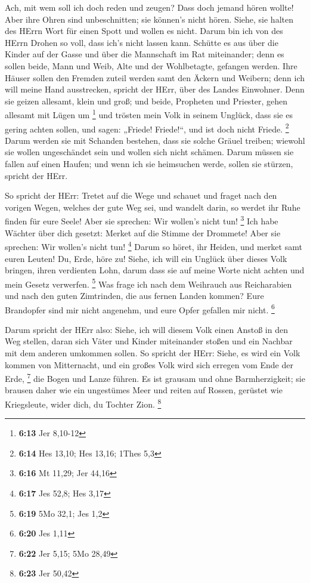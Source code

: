  Ach, mit wem soll ich doch reden und zeugen? Dass doch
jemand hören wollte! Aber ihre Ohren sind unbeschnitten; sie können's
nicht hören. Siehe, sie halten des HErrn Wort für einen Spott und wollen
es nicht.  Darum bin ich von des HErrn Drohen so voll, dass
ich's nicht lassen kann. Schütte es aus über die Kinder auf der Gasse
und über die Mannschaft im Rat miteinander; denn es sollen beide, Mann
und Weib, Alte und der Wohlbetagte, gefangen werden.  Ihre
Häuser sollen den Fremden zuteil werden samt den Äckern und Weibern;
denn ich will meine Hand ausstrecken, spricht der HErr, über des Landes
Einwohner.  Denn sie geizen allesamt, klein und groß; und
beide, Propheten und Priester, gehen allesamt mit Lügen um \footnote{\textbf{6:13}
  Jer 8,10-12}  und trösten mein Volk in seinem Unglück,
dass sie es gering achten sollen, und sagen: „Friede! Friede!{}``, und
ist doch nicht Friede. \footnote{\textbf{6:14} Hes 13,10; Hes 13,16;
  1Thes 5,3}  Darum werden sie mit Schanden bestehen, dass
sie solche Gräuel treiben; wiewohl sie wollen ungeschändet sein und
wollen sich nicht schämen. Darum müssen sie fallen auf einen Haufen; und
wenn ich sie heimsuchen werde, sollen sie stürzen, spricht der HErr.

 So spricht der HErr: Tretet auf die Wege und schauet und
fraget nach den vorigen Wegen, welches der gute Weg sei, und wandelt
darin, so werdet ihr Ruhe finden für eure Seele! Aber sie sprechen: Wir
wollen's nicht tun! \footnote{\textbf{6:16} Mt 11,29; Jer 44,16}
 Ich habe Wächter über dich gesetzt: Merket auf die Stimme
der Drommete! Aber sie sprechen: Wir wollen's nicht tun! \footnote{\textbf{6:17}
  Jes 52,8; Hes 3,17}  Darum so höret, ihr Heiden, und
merket samt euren Leuten!  Du, Erde, höre zu! Siehe, ich
will ein Unglück über dieses Volk bringen, ihren verdienten Lohn, darum
dass sie auf meine Worte nicht achten und mein Gesetz verwerfen.
\footnote{\textbf{6:19} 5Mo 32,1; Jes 1,2}  Was frage ich
nach dem Weihrauch aus Reicharabien und nach den guten Zimtrinden, die
aus fernen Landen kommen? Eure Brandopfer sind mir nicht angenehm, und
eure Opfer gefallen mir nicht. \footnote{\textbf{6:20} Jes 1,11}

 Darum spricht der HErr also: Siehe, ich will diesem Volk
einen Anstoß in den Weg stellen, daran sich Väter und Kinder miteinander
stoßen und ein Nachbar mit dem anderen umkommen sollen.  So
spricht der HErr: Siehe, es wird ein Volk kommen von Mitternacht, und
ein großes Volk wird sich erregen vom Ende der Erde, \footnote{\textbf{6:22}
  Jer 5,15; 5Mo 28,49}  die Bogen und Lanze führen. Es ist
grausam und ohne Barmherzigkeit; sie brausen daher wie ein ungestümes
Meer und reiten auf Rossen, gerüstet wie Kriegsleute, wider dich, du
Tochter Zion. \footnote{\textbf{6:23} Jer 50,42}

